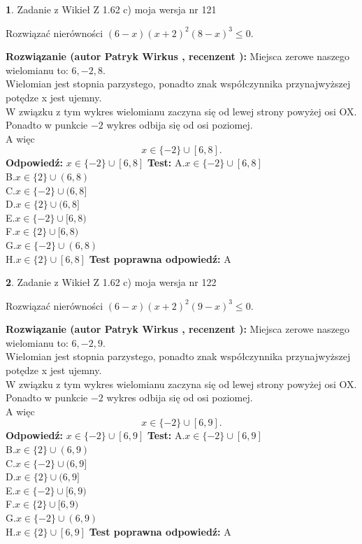 \documentclass[12pt, a4paper]{article}
\theoremstyle{definition} %
\newtheorem{zad}{}
\newcommand{\zadStart}[1]{\begin{zad}#1\newline}
\newcommand{\zadStop}{\end{zad}}
\newcommand{\rozwStart}[2]{\noindent \textbf{Rozwiązanie (autor #1 , recenzent #2): }\newline}
\newcommand{\rozwStop}{\newline}
\newcommand{\odpStart}{\noindent \textbf{Odpowiedź:}\newline}
\newcommand{\odpStop}{\newline}
\newcommand{\testStart}{\noindent \textbf{Test:}\newline}
\newcommand{\testStop}{\newline}
\newcommand{\kluczStart}{\noindent \textbf{Test poprawna odpowiedź:}\newline}
\newcommand{\kluczStop}{\newline}
\begin{document}
\zadStart{Zadanie z Wikieł Z 1.62 c) moja wersja nr 121}

Rozwiązać nierówności $(6-x)(x+2)^{2}(8-x)^{3}\le0$.
\zadStop
\rozwStart{Patryk Wirkus}{}
Miejsca zerowe naszego wielomianu to: $6, -2, 8$.\\
Wielomian jest stopnia parzystego, ponadto znak współczynnika przy\linebreak najwyższej potędze x jest ujemny.\\ W związku z tym wykres wielomianu zaczyna się od lewej strony powyżej osi OX.\\
Ponadto w punkcie $-2$ wykres odbija się od osi poziomej.\\
A więc $$x \in \{-2\} \cup [6,8].$$
\rozwStop
\odpStart
$x \in \{-2\} \cup [6,8]$
\odpStop
\testStart
A.$x \in \{-2\} \cup [6,8]$\\
B.$x \in \{2\} \cup (6,8)$\\
C.$x \in \{-2\} \cup (6,8]$\\
D.$x \in \{2\} \cup (6,8]$\\
E.$x \in \{-2\} \cup [6,8)$\\
F.$x \in \{2\} \cup [6,8)$\\
G.$x \in \{-2\} \cup (6,8)$\\
H.$x \in \{2\} \cup [6,8]$
\testStop
\kluczStart
A
\kluczStop



\zadStart{Zadanie z Wikieł Z 1.62 c) moja wersja nr 122}

Rozwiązać nierówności $(6-x)(x+2)^{2}(9-x)^{3}\le0$.
\zadStop
\rozwStart{Patryk Wirkus}{}
Miejsca zerowe naszego wielomianu to: $6, -2, 9$.\\
Wielomian jest stopnia parzystego, ponadto znak współczynnika przy\linebreak najwyższej potędze x jest ujemny.\\ W związku z tym wykres wielomianu zaczyna się od lewej strony powyżej osi OX.\\
Ponadto w punkcie $-2$ wykres odbija się od osi poziomej.\\
A więc $$x \in \{-2\} \cup [6,9].$$
\rozwStop
\odpStart
$x \in \{-2\} \cup [6,9]$
\odpStop
\testStart
A.$x \in \{-2\} \cup [6,9]$\\
B.$x \in \{2\} \cup (6,9)$\\
C.$x \in \{-2\} \cup (6,9]$\\
D.$x \in \{2\} \cup (6,9]$\\
E.$x \in \{-2\} \cup [6,9)$\\
F.$x \in \{2\} \cup [6,9)$\\
G.$x \in \{-2\} \cup (6,9)$\\
H.$x \in \{2\} \cup [6,9]$
\testStop
\kluczStart
A
\kluczStop
\end{document}
